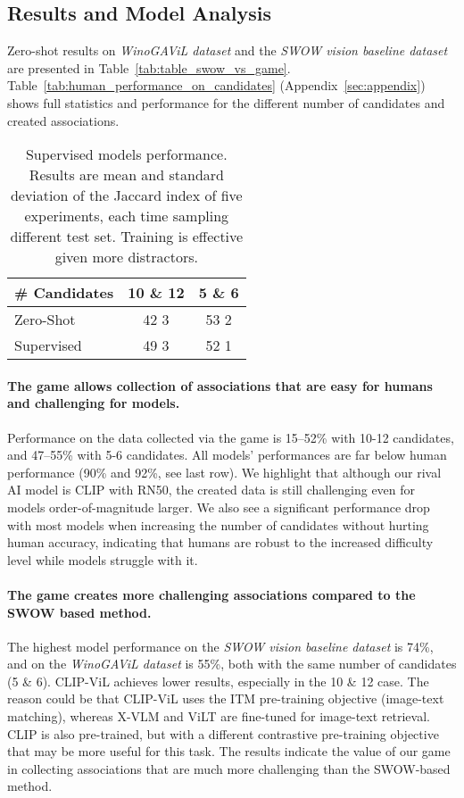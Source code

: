 \documentclass{article}
\newcommand{\ouracronym}[0]{WinoGAViL}
\newcommand{\swowsplit}[0]{\emph{\textit{SWOW} vision baseline dataset}}
\newcommand{\gamesplit}[0]{\emph{\textit{\ouracronym{}} dataset}}
\begin{document}
\subsection{Results and Model Analysis}

Zero-shot results on \gamesplit{} and the \swowsplit{} are presented in Table~\ref{tab:table_swow_vs_game}. Table~\ref{tab:human_performance_on_candidates} (Appendix~\ref{sec:appendix}) shows full statistics and performance for the different number of candidates and created associations.

\begin{wraptable}{R}{0.35\textwidth}
       \caption{Supervised models performance. Results are mean and standard deviation of the Jaccard index of five experiments, each time sampling different test set. Training is effective given more distractors.}
 \label{tab:table_trainable} \begin{tabular}{@{}lcc@{}}
    \toprule
    \#   Candidates & 10 \& 12 & 5 \& 6   \\ \midrule
    Zero-Shot       & 42  3 & 53  2 \\
    Supervised      & 49  3 & 52  1 \\ \bottomrule
    \end{tabular}
\end{wraptable}
%
 
\paragraph{The game allows collection of associations that are easy for humans and challenging for models.} Performance on the data collected via the game is 15--52\% with 10-12 candidates, and 47--55\% with 5-6 candidates. All models' performances are far below human performance (90\% and 92\%, see last row). We highlight that although our rival AI model is CLIP with RN50, the created data is still challenging even for models order-of-magnitude larger. We also see a significant performance drop with most models when increasing the number of candidates without hurting human accuracy, indicating that humans are robust to the increased difficulty level while models struggle with it.

\paragraph{The game creates more challenging associations compared to the SWOW based method.} The highest model performance on the \swowsplit{} is 74\%, and on the \gamesplit{} is 55\%, both with the same number of candidates (5 \& 6). CLIP-ViL achieves lower results, especially in the 10 \& 12 case. The reason could be that CLIP-ViL uses the ITM pre-training objective (image-text matching), whereas X-VLM and ViLT are fine-tuned for image-text retrieval. CLIP is also pre-trained, but with a different contrastive pre-training objective that may be more useful for this task. The results indicate the value of our game in collecting associations that are much more challenging than the SWOW-based method. 
\end{document}
